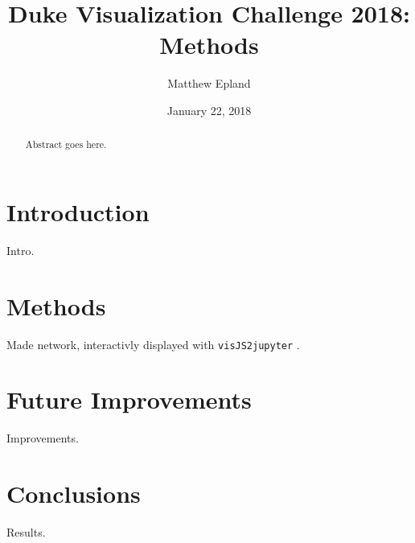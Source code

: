 \documentclass[notitlepage,aps,prd,nofootinbib]{revtex4-1}
\newcommand{\includedir}{../latex_files}
\begin{document}
\title{Duke Visualization Challenge 2018: Methods}
\author{Matthew\,\,Epland}
\date{January 22, 2018}


\begin{abstract}
Abstract goes here.
\end{abstract}

\maketitle

\section{Introduction}
Intro.

\section{Methods}
Made network, interactivly displayed with \texttt{visJS2jupyter} \cite{visJS2jupyter}.

\section{Future Improvements}
Improvements.

\section{Conclusions}
Results.





\end{document}
